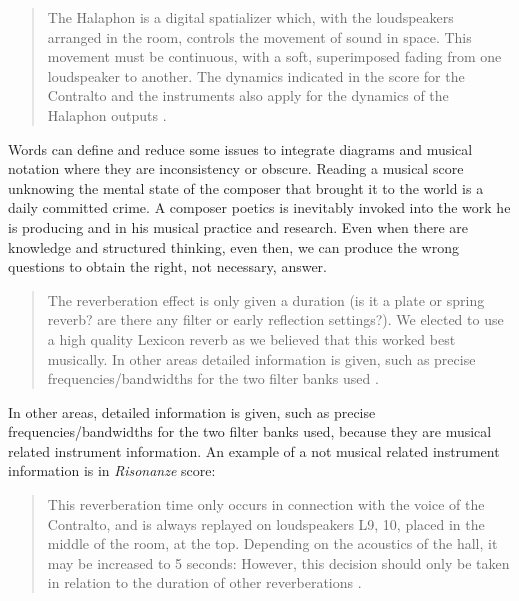 \documentclass[twoside,a4paper]{article}
\begin{document}
\begin{quote}
The Halaphon is a digital spatializer which, with the loudspeakers arranged in the
room, controls the movement of sound in space. This movement must be continuous,
with a soft, superimposed fading from one loudspeaker to another. The dynamics
indicated in the score for the Contralto and the instruments also apply for the
dynamics of the Halaphon outputs \cite{nlre87}. %
\end{quote}

Words can define and reduce some issues to integrate diagrams and musical notation
where they are inconsistency or obscure. Reading a musical score unknowing the mental
state of the composer that brought it to the world is a daily committed crime. A
composer poetics is inevitably invoked into the work he is producing and in his
musical practice and research. Even when there are knowledge and structured
thinking, even then, we can produce the wrong questions to obtain the right, not
necessary, answer.

\begin{quote}
The reverberation effect is only given a duration (is it a plate or spring reverb?
are there any filter or early reflection settings?). We elected to use a high
quality Lexicon reverb as we believed that this worked best musically. In other
areas detailed information is given, such as precise frequencies/bandwidths for
the two filter banks used \cite{rw05}.
\end{quote}

In other areas, detailed information is given, such as precise frequencies/bandwidths
for the two filter banks used, because they are musical related instrument
information. An example of a not musical related instrument information is in
\emph{Risonanze} score:

\begin{quote}
This reverberation time only occurs in connection with the voice of the Contralto,
and is always replayed on loudspeakers L9, 10, placed in the middle of the room,
at the top. Depending on the acoustics of the hall, it may be increased to 5
seconds: However, this decision should only be taken in relation to the duration
of other reverberations \cite{nlre87}.
\end{quote}
\end{document}
